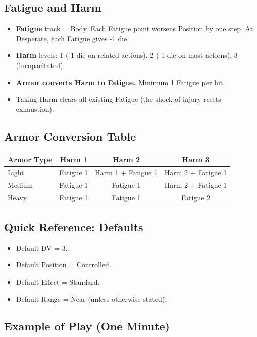 \subsection*{Fatigue and Harm}

\begin{itemize}
  \item \textbf{Fatigue} track = Body. Each Fatigue point worsens Position by one step. At Desperate, each Fatigue gives -1 die.
  \item \textbf{Harm} levels: 1 (-1 die on related actions), 2 (-1 die on most actions), 3 (incapacitated).
  \item \textbf{Armor converts Harm to Fatigue.} Minimum 1 Fatigue per hit.
  \item Taking Harm clears all existing Fatigue (the shock of injury resets exhaustion).
\end{itemize}

\subsection*{Armor Conversion Table}

\begin{tabular}{@{}lccc@{}}
\toprule
\textbf{Armor Type} & \textbf{Harm 1} & \textbf{Harm 2} & \textbf{Harm 3} \\
\midrule
Light  & Fatigue 1 & Harm 1 + Fatigue 1 & Harm 2 + Fatigue 1 \\
Medium & Fatigue 1 & Fatigue 1 & Harm 2 + Fatigue 1 \\
Heavy  & Fatigue 1 & Fatigue 1 & Fatigue 2 \\
\bottomrule
\end{tabular}

\subsection*{Quick Reference: Defaults}

\begin{itemize}
  \item Default DV = 3.
  \item Default Position = Controlled.
  \item Default Effect = Standard.
  \item Default Range = Near (unless otherwise stated).
\end{itemize}

\subsection*{Example of Play (One Minute)}

